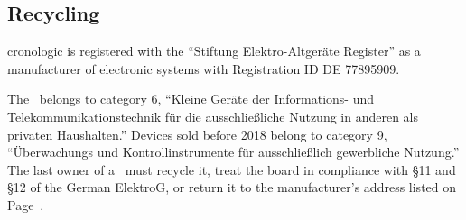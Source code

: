 \subsection{Recycling}
cronologic is registered with the ``Stiftung Elektro-Altgeräte Register''
as a manufacturer of electronic systems with Registration ID DE 77895909.\par
The \deviceName\ belongs to category 6, ``Kleine Geräte der Informations- und
Telekommunikationstechnik für die ausschließliche Nutzung in anderen als
privaten Haushalten.''  Devices sold before 2018 belong to category 9,
``Überwachungs und Kontrollinstrumente für ausschließlich
gewerbliche Nutzung.'' The last owner of a \deviceName\ must recycle it,
treat the board in compliance with \S{}11 and \S{}12 of the German ElektroG,
or return it to the manufacturer's address listed on Page~\pageref{cp:manu}.